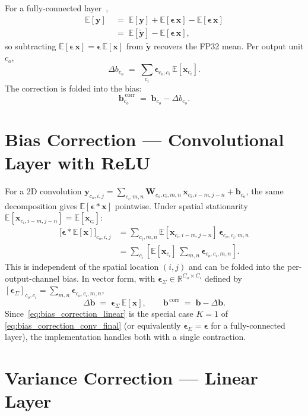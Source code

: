 \documentclass[11pt,a4paper]{article}
\newcommand{\W}{\mathbf{W}}
\newcommand{\xx}{\mathbf{x}}
\newcommand{\y}{\mathbf{y}}
\newcommand{\yt}{\widetilde{\mathbf{y}}}
\newcommand{\beps}{\boldsymbol{\epsilon}}
\newcommand{\E}{\mathbb{E}}
\begin{document}
For a fully-connected layer~\cite[Eq.~16--17]{nagel2019},
\begin{align}
\E[\y] \;&=\; \E[\y] + \E[\beps\,\xx] - \E[\beps\,\xx] \\
       \;&=\; \E[\yt] - \E[\beps\,\xx],
\end{align}
so subtracting $\E[\beps\,\xx] = \beps\,\E[\xx]$ from $\yt$ recovers the FP32 mean. Per output unit $c_o$,
\begin{equation}
\Delta b_{c_o} \;=\; \sum_{c_i} \beps_{c_o,c_i}\,\E[\xx_{c_i}].
\end{equation}
The correction is folded into the bias:
\begin{equation}
\mathbf{b}_{c_o}^{\,\mathrm{corr}} \;=\; \mathbf{b}_{c_o} - \Delta b_{c_o}.
\label{eq:bias_correction_linear}
\end{equation}

\section{Bias Correction --- Convolutional Layer with ReLU}
\label{sec:bias_conv}

For a 2D convolution $\y_{c_o,i,j} = \sum_{c_i,m,n} \W_{c_o,c_i,m,n}\,\xx_{c_i,i-m,j-n} + \mathbf{b}_{c_o}$, the same decomposition gives $\E[\beps\!*\!\xx]$ pointwise. Under spatial stationarity $\E[\xx_{c_i,i-m,j-n}] = \E[\xx_{c_i}]$:
\begin{align}
\bigl[\beps\!*\!\E[\xx]\bigr]_{c_o,i,j}
  &= \sum_{c_i,m,n}\E[\xx_{c_i,i-m,j-n}]\,\beps_{c_o,c_i,m,n} \\
  &= \sum_{c_i}\!\left[\E[\xx_{c_i}]\,\sum_{m,n}\beps_{c_o,c_i,m,n}\right].
\label{eq:bias_correction_conv_expanded}
\end{align}
This is independent of the spatial location $(i,j)$ and can be folded into the per-output-channel bias. In vector form, with $\beps_\Sigma \in \mathbb{R}^{C_o\times C_i}$ defined by $[\beps_\Sigma]_{c_o,c_i} = \sum_{m,n}\beps_{c_o,c_i,m,n}$,
\begin{equation}
\boxed{\;\Delta\mathbf{b} \;=\; \beps_\Sigma\,\E[\xx], \qquad \mathbf{b}^{\,\mathrm{corr}} \;=\; \mathbf{b} - \Delta\mathbf{b}.\;}
\label{eq:bias_correction_conv_final}
\end{equation}
Since~\eqref{eq:bias_correction_linear} is the special case $K=1$ of \eqref{eq:bias_correction_conv_final} (or equivalently $\beps_\Sigma = \beps$ for a fully-connected layer), the implementation handles both with a single contraction.

\section{Variance Correction --- Linear Layer}
\label{sec:var_linear}
\end{document}
